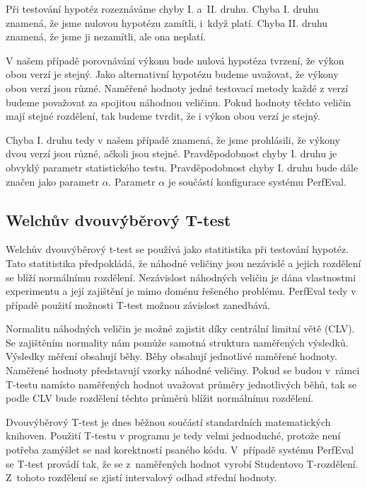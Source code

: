 Při testování hypotéz rozeznáváme
chyby I. a~II. druhu. Chyba I. druhu znamená, že jsme nulovou hypotézu zamítli,
i~když platí. Chyba II. druhu znamená, že jsme ji nezamítli, ale ona neplatí.

V našem případě porovnávání výkonu bude nulová hypotéza tvrzení, že výkon obou verzí je stejný.
Jako alternativní hypotézu budeme uvažovat, že výkony obou verzí jsou různé.
Naměřené hodnoty jedné testovací metody každé z verzí budeme považovat za spojitou náhodnou veličinu.
Pokud hodnoty těchto veličin mají stejné rozdělení, tak budeme tvrdit, že i výkon obou verzí je stejný.

Chyba I. druhu tedy v našem případě znamená, že jsme prohlásili, že výkony dvou verzí jsou různé,
ačkoli jsou stejné. Pravděpodobnost chyby I. druhu je obvyklý parametr statistického testu.
Pravděpodobnost chyby I. druhu bude dále značen jako parametr $\alpha$. Parametr $\alpha$
je součástí konfigurace systému PerfEval.

\subsection{Welchův dvouvýběrový T-test}

Welchův dvouvýběrový t-test se používá jako statitistika při testování hypotéz.
Tato statitistika předpokládá, že náhodné veličiny jsou nezávislé a jejich rozdělení
se blíží normálnímu rozdělení. Nezávislost náhodných veličin je dána vlastnostmi
experimentu \cite[]{twosampletests} a její zajištění je mimo doménu řešeného problému. PerfEval
tedy v případě použití možnosti T-test možnou závislost zanedbává.

Normalitu náhodných veličin je možné zajistit díky centrální limitní větě (CLV).
Se zajištěním normality nám pomůže samotná struktura naměřených výsledků. Výsledky měření
obsahují běhy. Běhy obsahují jednotlivé naměřené hodnoty. Naměřené hodnoty představují
vzorky náhodné veličiny. Pokud se budou v~rámci T-testu namísto naměřených hodnot uvažovat
průměry jednotlivých běhů, tak se podle CLV bude rozdělení těchto průměrů blížit normálnímu rozdělení.

Dvouvýběrový T-test je dnes běžnou součástí standardních matematických knihoven.
Použití T-testu v programu je tedy velmi jednoduché, protože není potřeba zamýšlet se
nad korektností psaného kódu. V~případě systému PerfEval se T-test provádí tak, že
se z~naměřených hodnot vyrobí Studentovo T-rozdělení. Z~tohoto rozdělení se zjistí
intervalový odhad střední hodnoty.


